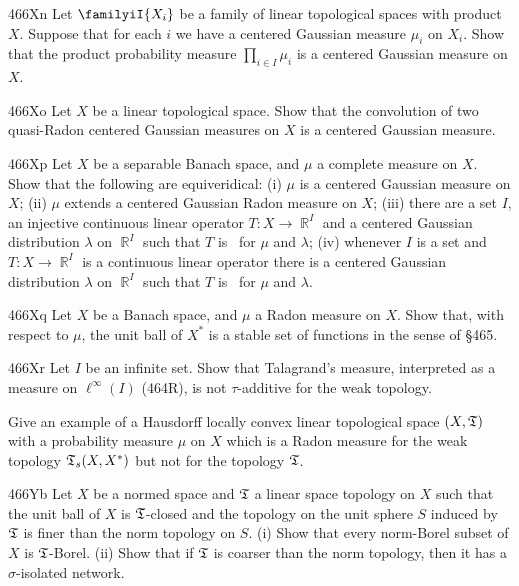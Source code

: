 {\spheader 466Xn
Let $\familyiI{X_i}$ be a family of linear topological
spaces with product $X$.   Suppose that for each $i$ we have a centered
Gaussian measure $\mu_i$ on $X_i$.   Show that the product probability
measure $\prod_{i\in I}\mu_i$ is a centered Gaussian measure on $X$.

\spheader 466Xo
Let $X$ be a linear topological space.   Show that the convolution of
two quasi-Radon centered Gaussian measures on $X$ is a centered Gaussian
measure.

\spheader 466Xp
Let $X$ be a separable Banach space, and $\mu$ a
complete measure on $X$.   Show that the following are
equiveridical:  (i) $\mu$ is a centered Gaussian measure on $X$;
(ii) $\mu$ extends a centered Gaussian Radon measure on $X$;
(iii) there are a set $I$, an injective continuous linear operator
$T:X\to\BbbR^I$ and a centered Gaussian distribution $\lambda$ on
$\BbbR^I$ such that $T$ is \imp\ for $\mu$ and $\lambda$;
(iv) whenever $I$ is a set and $T:X\to\BbbR^I$ is a continuous linear
operator there is a centered Gaussian distribution $\lambda$ on
$\BbbR^I$ such that $T$ is \imp\ for $\mu$ and $\lambda$.

\spheader 466Xq Let $X$ be a Banach space, and $\mu$ a Radon measure on
$X$.   Show that, with respect to $\mu$, the unit ball of $X^*$ is a
stable set of functions in the sense of \S465.   

\sqheader 466Xr Let $I$ be an infinite set.
Show that Talagrand's measure, interpreted as a measure
on $\ell^{\infty}(I)$ (464R), is not $\tau$-additive for the weak
topology.

Give an example of a Hausdorff locally convex linear topological space
$(X,\frak T)$ with a probability measure $\mu$ on $X$ which is a Radon
measure for the weak topology $\frak T_s(X,X^*)$ but not for the
topology $\frak T$.   

\spheader 466Yb
Let $X$ be a normed space and $\frak T$ a linear space topology on $X$
such that the unit ball of $X$ is $\frak T$-closed
and the topology on the unit sphere $S$ induced by $\frak T$ is finer
than the norm topology on $S$.
(i) Show that every norm-Borel subset of $X$
is $\frak T$-Borel.   (ii) Show that if $\frak T$ is coarser than the norm
topology, then it has a $\sigma$-isolated network.

}
